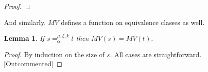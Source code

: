 \documentclass{lmcs}
\theoremstyle{theorem}\newtheorem{theorem}{Theorem}
\theoremstyle{theorem}\newtheorem{lemma}[theorem]{Lemma}
\theoremstyle{theorem}\newtheorem{corollary}[theorem]{Corollary}
\theoremstyle{definition}\newtheorem{definition}[theorem]{Definition}
\theoremstyle{definition}\newtheorem{example}[theorem]{Example}
\newcommand{\Vfree}{\mathcal{V}_{\mathit{nonb}}}
\newcommand{\Vbound}{\mathcal{V}_{\mathit{binder}}}
\newcommand{\FV}{\mathit{FV}}
\newcommand{\FMV}{\mathit{MV}}
\newcommand{\identifier}[1]{\mathtt{#1}}
\newcommand{\afun}{\identifier{f}}
\newcommand{\avar}{x}
\newcommand{\Bvar}{Y}
\newcommand{\abs}[2]{\lambda #1.#2}
\newcommand{\meta}[2]{#1\langle#2\rangle}
\newcommand{\tuple}[2]{\llparenthesis #1,\dots,#2 \rrparenthesis}
\begin{document}
\begin{proof}
\end{proof}

And similarly, $\FMV$ defines a function on equivalence classes as well.

\begin{lemma}\label{lem:alphamvar}
If $s =_\alpha^{\mu,\xi,k} t$ then $\FMV(s) = \FMV(t)$.
\end{lemma}

\begin{proof}
By induction on the size of $s$.
All cases are straightforward. [Outcommented]
\end{proof}
\end{document}
